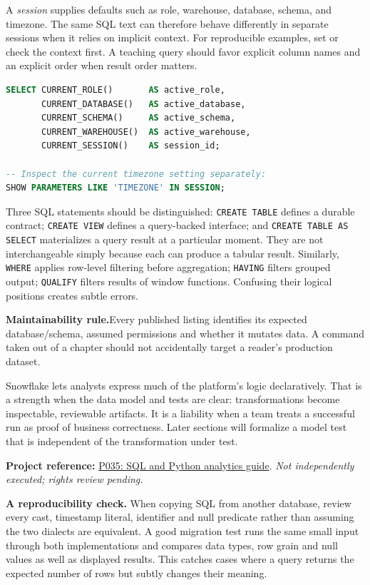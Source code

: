 \documentclass[11pt,twoside]{article}
\newcommand{\repo}[2]{\par\begingroup\fontsize{8.0}{9.6}\selectfont\sffamily\color{inkgray}\textbf{Project reference:} \href{#2}{#1}. \textit{Not independently executed; rights review pending.}\par\endgroup}
\begin{document}
A \emph{session} supplies defaults such as role, warehouse, database, schema, and timezone. The same SQL text can therefore behave differently in separate sessions when it relies on implicit context. For reproducible examples, set or check the context first. A teaching query should favor explicit column names and an explicit order when result order matters.

\begin{lstlisting}[language=SQL,caption={Inspect session context before reproducing a lesson.}]
SELECT CURRENT_ROLE()       AS active_role,
       CURRENT_DATABASE()   AS active_database,
       CURRENT_SCHEMA()     AS active_schema,
       CURRENT_WAREHOUSE()  AS active_warehouse,
       CURRENT_SESSION()    AS session_id;

-- Inspect the current timezone setting separately:
SHOW PARAMETERS LIKE 'TIMEZONE' IN SESSION;
\end{lstlisting}

Three SQL statements should be distinguished: \texttt{CREATE TABLE} defines a durable contract; \texttt{CREATE VIEW} defines a query-backed interface; and \texttt{CREATE TABLE AS SELECT} materializes a query result at a particular moment. They are not interchangeable simply because each can produce a tabular result. Similarly, \texttt{WHERE} applies row-level filtering before aggregation; \texttt{HAVING} filters grouped output; \texttt{QUALIFY} filters results of window functions. Confusing their logical positions creates subtle errors.

\begin{whitebox}\textbf{Maintainability rule.}\quad Every published listing identifies its expected database/schema, assumed permissions and whether it mutates data. A command taken out of a chapter should not accidentally target a reader's production dataset.\end{whitebox}

Snowflake lets analysts express much of the platform's logic declaratively. That is a strength when the data model and tests are clear: transformations become inspectable, reviewable artifacts. It is a liability when a team treats a successful run as proof of business correctness. Later sections will formalize a model test that is independent of the transformation under test.
\repo{P035: SQL and Python analytics guide}{https://github.com/Snowflake-Labs/sfguide-getting-started-with-data-analytics-with-sql-python}


\textbf{A reproducibility check.} When copying SQL from another database, review every cast, timestamp literal, identifier and null predicate rather than assuming the two dialects are equivalent. A good migration test runs the same small input through both implementations and compares data types, row grain and null values as well as displayed results. This catches cases where a query returns the expected number of rows but subtly changes their meaning.
\end{document}
